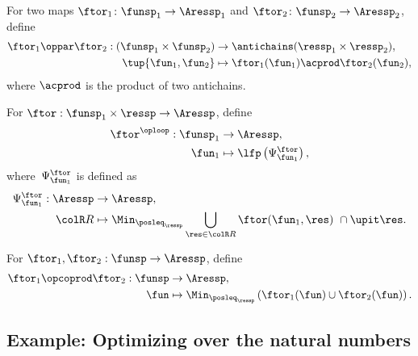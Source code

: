 \begin{definition}
     \label{def:oppar}
    For two maps $\ftor_{1}\colon\funsp_{1}\rightarrow\Aressp_{1}$
    and $\ftor_{2}\colon\funsp_{2}\rightarrow\Aressp_{2}$, define
    \begin{align}
        \ftor_{1}\oppar\ftor_{2}:(\funsp_{1}\times\funsp_{2}) & \rightarrow\antichains(\ressp_{1}\times\ressp_{2}),\label{eq:oppar}\\
        \tup{ \fun_{1},\fun_{2}}  & \mapsto\ftor_{1}(\fun_{1})\acprod\ftor_{2}(\fun_{2}),\nonumber
    \end{align}
    where $\acprod$ is the product of two antichains.
\end{definition}

\begin{definition}
    \label{def:oploop1}
    For $\ftor:\funsp_{1}\times\ressp\rightarrow\Aressp$,
    define
    \begin{align}
        \ftor^{\oploop}:\funsp_{1} & \rightarrow\Aressp,\nonumber \\
        \fun_{1} & \mapsto\lfp\left(\Psi_{\fun_{1}}^{\ftor}\right),
    \end{align}
    where~$\Psi_{\fun_{1}}^{\ftor}$ is defined as
    \begin{align}
        \Psi_{\fun_{1}}^{\ftor}:\Aressp & \rightarrow\Aressp,\nonumber \\
        {\colR R} & \mapsto\Min_{\posleq_{\ressp}}\bigcup_{\res\in{\colR R}}\ftor(\fun_{1},\res)\ \cap\upit\res.\label{eq:phi}
    \end{align}
\end{definition}

\begin{definition}
    \label{def:opcoprod}For $\ftor_{1},\ftor_{2}:\funsp\rightarrow\Aressp$,
    define
    \begin{align*}
        \ftor_{1}\opcoprod\ftor_{2}:\funsp & \rightarrow\Aressp,\\
        \fun& \mapsto\Min_{\posleq_{\ressp}}\left(\ftor_{1}(\fun)\cup\ftor_{2}(\fun)\right).
    \end{align*}
\end{definition}

\subsection{Example: Optimizing over the natural numbers}

